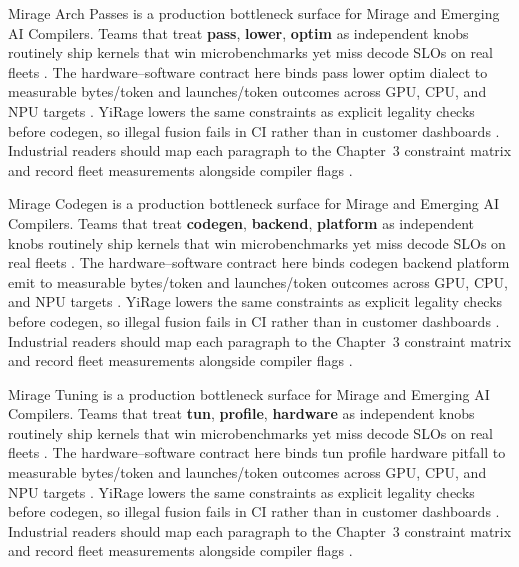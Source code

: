 Mirage Arch Passes is a production bottleneck surface for Mirage and Emerging AI Compilers. Teams that treat \textbf{pass}, \textbf{lower}, \textbf{optim} as independent knobs routinely ship kernels that win microbenchmarks yet miss decode SLOs on real fleets \citep{taxbreak2026,semianalysis2024tma}. The hardware--software contract here binds pass lower optim dialect to measurable bytes/token and launches/token outcomes across GPU, CPU, and NPU targets \citep{memoryfloor2026,amd2024xdna}. YiRage lowers the same constraints as explicit legality checks before codegen, so illegal fusion fails in CI rather than in customer dashboards \citep{nvidia2022hopper,amd2024aie}. Industrial readers should map each paragraph to the Chapter~3 constraint matrix and record fleet measurements alongside compiler flags \citep{semianalysis2024tma,dlbook}.

Mirage Codegen is a production bottleneck surface for Mirage and Emerging AI Compilers. Teams that treat \textbf{codegen}, \textbf{backend}, \textbf{platform} as independent knobs routinely ship kernels that win microbenchmarks yet miss decode SLOs on real fleets \citep{memoryfloor2026,amd2024xdna}. The hardware--software contract here binds codegen backend platform emit to measurable bytes/token and launches/token outcomes across GPU, CPU, and NPU targets \citep{nvidia2022hopper,amd2024aie}. YiRage lowers the same constraints as explicit legality checks before codegen, so illegal fusion fails in CI rather than in customer dashboards \citep{semianalysis2024tma,dlbook}. Industrial readers should map each paragraph to the Chapter~3 constraint matrix and record fleet measurements alongside compiler flags \citep{amd2024xdna,dao2022flashattention}.

Mirage Tuning is a production bottleneck surface for Mirage and Emerging AI Compilers. Teams that treat \textbf{tun}, \textbf{profile}, \textbf{hardware} as independent knobs routinely ship kernels that win microbenchmarks yet miss decode SLOs on real fleets \citep{nvidia2022hopper,amd2024aie}. The hardware--software contract here binds tun profile hardware pitfall to measurable bytes/token and launches/token outcomes across GPU, CPU, and NPU targets \citep{semianalysis2024tma,dlbook}. YiRage lowers the same constraints as explicit legality checks before codegen, so illegal fusion fails in CI rather than in customer dashboards \citep{amd2024xdna,dao2022flashattention}. Industrial readers should map each paragraph to the Chapter~3 constraint matrix and record fleet measurements alongside compiler flags \citep{amd2024aie,kwon2023vllm}.

